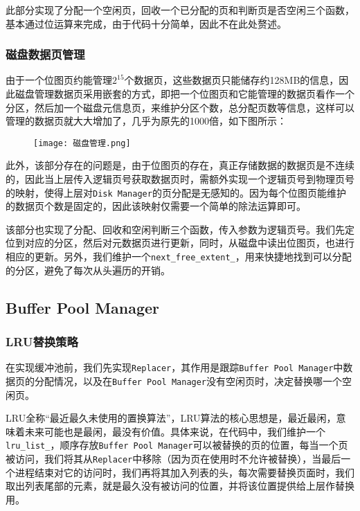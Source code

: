 \documentclass[12pt]{article}
\begin{document}
    此部分实现了分配一个空闲页，回收一个已分配的页和判断页是否空闲三个函数，基本通过位运算来完成，由于代码十分简单，因此不在此处赘述。

    \subsubsection{磁盘数据页管理}
    由于一个位图页约能管理$2^{15}$个数据页，这些数据页只能储存约128MB的信息，因此磁盘管理数据页采用嵌套的方式，即把一个位图页和它能管理的数据页看作一个分区，然后加一个磁盘元信息页，来维护分区个数，总分配页数等信息，这样可以管理的数据页就大大增加了，几乎为原先的1000倍，如下图所示：

    \begin{figure}[H]
    \centering
    \texttt{[image: 磁盘管理.png]}
    \end{figure}

    此外，该部分存在的问题是，由于位图页的存在，真正存储数据的数据页是不连续的，因此当上层传入逻辑页号获取数据页时，需额外实现一个逻辑页号到物理页号的映射，使得上层对\texttt{Disk Manager}的页分配是无感知的。因为每个位图页能维护的数据页个数是固定的，因此该映射仅需要一个简单的除法运算即可。

    该部分也实现了分配、回收和空闲判断三个函数，传入参数为逻辑页号。我们先定位到对应的分区，然后对元数据页进行更新，同时，从磁盘中读出位图页，也进行相应的更新。另外，我们维护一个\texttt{next\_free\_extent\_}，用来快捷地找到可以分配的分区，避免了每次从头遍历的开销。

    \subsection{Buffer Pool Manager}
    \subsubsection{LRU替换策略}
    在实现缓冲池前，我们先实现\texttt{Replacer}，其作用是跟踪\texttt{Buffer Pool Manager}中数据页的分配情况，以及在\texttt{Buffer Pool Manager}没有空闲页时，决定替换哪一个空闲页。

    LRU全称“最近最久未使用的置换算法”，LRU算法的核心思想是，最近最闲，意味着未来可能也是最闲，最没有价值。具体来说，在代码中，我们维护一个\texttt{lru\_list\_}，顺序存放\texttt{Buffer Pool Manager}可以被替换的页的位置，每当一个页被访问，我们将其从\texttt{Replacer}中移除（因为页在使用时不允许被替换），当最后一个进程结束对它的访问时，我们再将其加入列表的头，每次需要替换页面时，我们取出列表尾部的元素，就是最久没有被访问的位置，并将该位置提供给上层作替换用。
\end{document}
